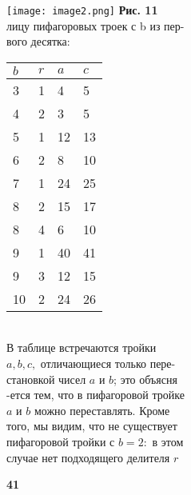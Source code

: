 \documentclass[11pt]{article}
\begin{document}
\begin{minipage}{0.5\textwidth}
  \begin{flushleft}
    \texttt{[image: image2.png]}
    \textbf{Рис. 11} \\
    \vspace{5mm}
    лицу пифагоровых троек с b из пер-\\вого десятка:
    \vspace{5mm}\\
    \vspace{5mm}
    \begin{tabular}{| p{1.15cm}|p{1.15cm}|p{1.15cm}|p{1.15cm}|}
        \hline
        $b$ & $r$ &  $a$ & $c$\\[2.2mm]
        \hline
        3 & 1 & 4 & 5\\[2.2mm]
        \hline
        4 & 2 & 3 & 5\\[2.2mm]
        \hline
        5 & 1 & 12 & 13\\[2.2mm]
        \hline
        6 & 2 & 8 & 10 \\[2.2mm]
        \hline
        7 & 1 & 24 & 25\\[2.2mm]
        \hline
        8 & 2 & 15 & 17 \\[2.2mm]
        \hline
        8 & 4 & 6 & 10 \\[2.2mm]
        \hline
        9 & 1 & 40 & 41 \\[2.2mm]
        \hline
        9 & 3 & 12 & 15 \\[2.2mm]
        \hline
        10 & 2 & 24 & 26 \\[2.2mm]
        \hline
        
    \end{tabular}\\
    \vspace{5mm}
    \vspace{5mm}
    \leftskip=0.6cm В таблице встречаются тройки \\
    \leftskip=0cm
    $a, b, c,$ отличающиеся только пере-\\становкой чисел $a$ и $b$; это объясня\\-ется тем, что в пифагоровой тройке\\$a$ и $b$ можно переставлять. Кроме\\того, мы видим, что не существует\\пифагоровой тройки с $b=2:$ в этом\\случае нет подходящего делителя $r$\\
    
  \end{flushleft}
\end{minipage}
\begin{flushright}
    \textbf{41} \hspace{}
\end{flushright}
\end{document}

